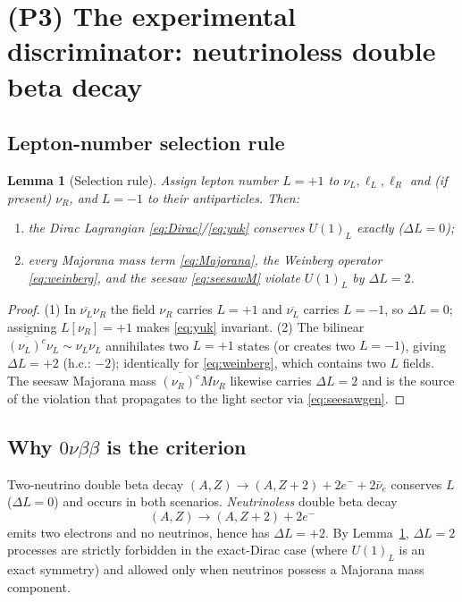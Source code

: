 \documentclass[12pt]{article}
\newtheorem{lemma}{Lemma}
\theoremstyle{definition}
\newcommand{\nuL}{\nu_L}
\newcommand{\nuR}{\nu_R}
\begin{document}
\section{(P3) The experimental discriminator: neutrinoless double beta decay}

\subsection{Lepton-number selection rule}
\begin{lemma}[Selection rule]\label{lem:LN}
Assign lepton number $L=+1$ to $\nuL,\ell_L,\ell_R$ and (if present)
$\nuR$, and $L=-1$ to their antiparticles. Then:
\begin{enumerate}
\item the Dirac Lagrangian \eqref{eq:Dirac}/\eqref{eq:yuk} conserves
$U(1)_L$ exactly ($\Delta L=0$);
\item every Majorana mass term
\eqref{eq:Majorana}, the Weinberg operator \eqref{eq:weinberg}, and the
seesaw \eqref{eq:seesawM} violate $U(1)_L$ by $\Delta L=2$.
\end{enumerate}
\end{lemma}
\begin{proof}
(1) In $\overline{\nuL}\nuR$ the field $\nuR$ carries $L=+1$ and
$\overline{\nuL}$ carries $L=-1$, so $\Delta L=0$; assigning
$L[\nuR]=+1$ makes \eqref{eq:yuk} invariant.
(2) The bilinear $\overline{(\nuL)^c}\nuL\sim \nuL\nuL$ annihilates two
$L=+1$ states (or creates two $L=-1$), giving $\Delta L=+2$ (h.c.:
$-2$); identically for \eqref{eq:weinberg}, which contains two $L$ fields.
The seesaw Majorana mass $\overline{(\nuR)^c}M\nuR$ likewise carries
$\Delta L=2$ and is the source of the violation that propagates to the
light sector via \eqref{eq:seesawgen}.
\end{proof}

\subsection{Why $0\nu\beta\beta$ is the criterion}
Two-neutrino double beta decay
$(A,Z)\to(A,Z+2)+2e^-+2\bar\nu_e$ conserves $L$ ($\Delta L=0$) and occurs
in both scenarios. \emph{Neutrinoless} double beta decay
\begin{equation}\label{eq:0nubb}
(A,Z)\to(A,Z+2)+2e^-
\end{equation}
emits two electrons and no neutrinos, hence has $\Delta L=+2$. By
Lemma~\ref{lem:LN}, $\Delta L=2$ processes are strictly forbidden in the
exact-Dirac case (where $U(1)_L$ is an exact symmetry) and allowed only
when neutrinos possess a Majorana mass component.
\end{document}
